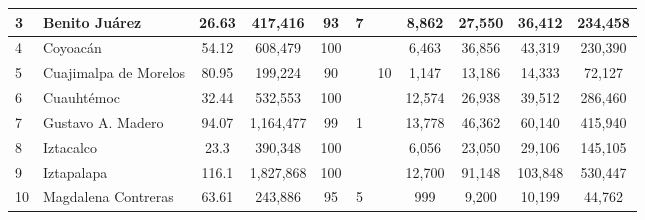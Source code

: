 \begin{landscape}
\begin{table}[]
{\begin{tabular}{llcccllcccc}
\multicolumn{1}{|l|}{3} & \multicolumn{1}{l|}{Benito Juárez} & \multicolumn{1}{c|}{26.63} & \multicolumn{1}{c|}{417,416} & \multicolumn{1}{c|}{93} & \multicolumn{1}{c|}{7} & \multicolumn{1}{l|}{} & \multicolumn{1}{c|}{8,862} & \multicolumn{1}{c|}{27,550} & \multicolumn{1}{c|}{36,412} & \multicolumn{1}{c|}{234,458} \\ \hline
\multicolumn{1}{|l|}{4} & \multicolumn{1}{l|}{Coyoacán} & \multicolumn{1}{c|}{54.12} & \multicolumn{1}{c|}{608,479} & \multicolumn{1}{c|}{100} & \multicolumn{1}{l|}{} & \multicolumn{1}{l|}{} & \multicolumn{1}{c|}{6,463} & \multicolumn{1}{c|}{36,856} & \multicolumn{1}{c|}{43,319} & \multicolumn{1}{c|}{230,390} \\ \hline
\multicolumn{1}{|l|}{5} & \multicolumn{1}{l|}{Cuajimalpa de Morelos} & \multicolumn{1}{c|}{80.95} & \multicolumn{1}{c|}{199,224} & \multicolumn{1}{c|}{90} & \multicolumn{1}{l|}{} & \multicolumn{1}{c|}{10} & \multicolumn{1}{c|}{1,147} & \multicolumn{1}{c|}{13,186} & \multicolumn{1}{c|}{14,333} & \multicolumn{1}{c|}{72,127} \\ \hline
\multicolumn{1}{|l|}{6} & \multicolumn{1}{l|}{Cuauhtémoc} & \multicolumn{1}{c|}{32.44} & \multicolumn{1}{c|}{532,553} & \multicolumn{1}{c|}{100} & \multicolumn{1}{l|}{} & \multicolumn{1}{l|}{} & \multicolumn{1}{c|}{12,574} & \multicolumn{1}{c|}{26,938} & \multicolumn{1}{c|}{39,512} & \multicolumn{1}{c|}{286,460} \\ \hline
\multicolumn{1}{|l|}{7} & \multicolumn{1}{l|}{Gustavo A. Madero} & \multicolumn{1}{c|}{94.07} & \multicolumn{1}{c|}{1,164,477} & \multicolumn{1}{c|}{99} & \multicolumn{1}{c|}{1} & \multicolumn{1}{l|}{} & \multicolumn{1}{c|}{13,778} & \multicolumn{1}{c|}{46,362} & \multicolumn{1}{c|}{60,140} & \multicolumn{1}{c|}{415,940} \\ \hline
\multicolumn{1}{|l|}{8} & \multicolumn{1}{l|}{Iztacalco} & \multicolumn{1}{c|}{23.3} & \multicolumn{1}{c|}{390,348} & \multicolumn{1}{c|}{100} & \multicolumn{1}{l|}{} & \multicolumn{1}{l|}{} & \multicolumn{1}{c|}{6,056} & \multicolumn{1}{c|}{23,050} & \multicolumn{1}{c|}{29,106} & \multicolumn{1}{c|}{145,105} \\ \hline
\multicolumn{1}{|l|}{9} & \multicolumn{1}{l|}{Iztapalapa} & \multicolumn{1}{c|}{116.1} & \multicolumn{1}{c|}{1,827,868} & \multicolumn{1}{c|}{100} & \multicolumn{1}{l|}{} & \multicolumn{1}{l|}{} & \multicolumn{1}{c|}{12,700} & \multicolumn{1}{c|}{91,148} & \multicolumn{1}{c|}{103,848} & \multicolumn{1}{c|}{530,447} \\ \hline
\multicolumn{1}{|l|}{10} & \multicolumn{1}{l|}{Magdalena Contreras} & \multicolumn{1}{c|}{63.61} & \multicolumn{1}{c|}{243,886} & \multicolumn{1}{c|}{95} & \multicolumn{1}{c|}{5} & \multicolumn{1}{l|}{} & \multicolumn{1}{c|}{999} & \multicolumn{1}{c|}{9,200} & \multicolumn{1}{c|}{10,199} & \multicolumn{1}{c|}{44,762} \\ \hline

\end{tabular}}
\end{table}
\end{landscape}
